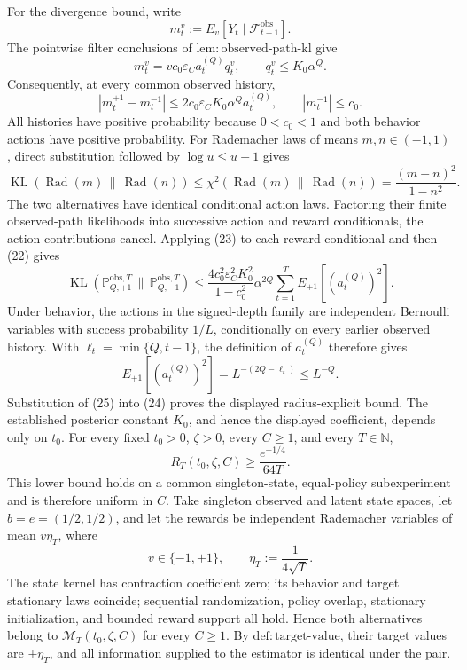 For the divergence bound, write
\[
 m_t^v:=E_v[Y_t\mid\mathcal F_{t-1}^{\mathrm{obs}}].
\]
The pointwise filter conclusions of \(\mathrm{lem{:}observed\text{-}path\text{-}kl}\) give
\[
 m_t^v=vc_0\varepsilon_Ca_t^{(Q)}q_t^v,
 \qquad q_t^v\le K_0\alpha^Q.
\]
Consequently, at every common observed history,
\[
 |m_t^{+1}-m_t^{-1}|
 \le2c_0\varepsilon_CK_0\alpha^Qa_t^{(Q)},
 \qquad |m_t^{-1}|\le c_0. \tag{22}
\]
All histories have positive probability because \(0<c_0<1\) and both behavior actions have positive probability.  For Rademacher laws of means \(m,n\in(-1,1)\), direct substitution followed by \(\log u\le u-1\) gives
\[
 \operatorname{KL}(\operatorname{Rad}(m)\,\|\,\operatorname{Rad}(n))
 \le\chi^2(\operatorname{Rad}(m)\,\|\,\operatorname{Rad}(n))
 =\frac{(m-n)^2}{1-n^2}. \tag{23}
\]
The two alternatives have identical conditional action laws.  Factoring their finite observed-path likelihoods into successive action and reward conditionals, the action contributions cancel.  Applying (23) to each reward conditional and then (22) gives
\[
 \operatorname{KL}(\mathbb P_{Q,+1}^{\mathrm{obs},T}\,\|\,
                    \mathbb P_{Q,-1}^{\mathrm{obs},T})
 \le\frac{4c_0^2\varepsilon_C^2K_0^2}{1-c_0^2}
 \alpha^{2Q}\sum_{t=1}^TE_{+1}[(a_t^{(Q)})^2]. \tag{24}
\]
Under behavior, the actions in the signed-depth family are independent Bernoulli variables with success probability \(1/L\), conditionally on every earlier observed history.  With \(\ell_t=\min\{Q,t-1\}\), the definition of \(a_t^{(Q)}\) therefore gives
\[
 E_{+1}[(a_t^{(Q)})^2]
 =L^{-(2Q-\ell_t)}\le L^{-Q}. \tag{25}
\]
Substitution of (25) into (24) proves the displayed radius-explicit bound.  The established posterior constant \(K_0\), and hence the displayed coefficient, depends only on \(t_0\).
For every fixed \(t_0>0\), \(\zeta>0\), every \(C\ge1\), and every \(T\in\mathbb N\),
\[
 R_T(t_0,\zeta,C)\ge\frac{e^{-1/4}}{64T}.
\]
This lower bound holds on a common singleton-state, equal-policy subexperiment and is therefore uniform in \(C\).
Take singleton observed and latent state spaces, let \(b=e=(1/2,1/2)\), and let the rewards be independent Rademacher variables of mean \(v\eta_T\), where
\[
 v\in\{-1,+1\},
 \qquad
 \eta_T:=\frac1{4\sqrt T}.
\]
The state kernel has contraction coefficient zero; its behavior and target stationary laws coincide; sequential randomization, policy overlap, stationary initialization, and bounded reward support all hold.  Hence both alternatives belong to \(\mathcal M_T(t_0,\zeta,C)\) for every \(C\ge1\).  By \(\mathrm{def{:}target\text{-}value}\), their target values are \(\pm\eta_T\), and all information supplied to the estimator is identical under the pair.

